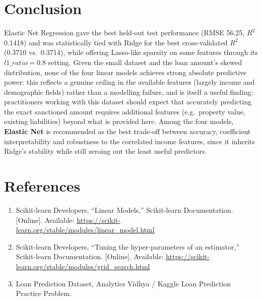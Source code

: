 \documentclass[12pt,a4paper]{article}
\begin{document}
\section{Conclusion}
Elastic Net Regression gave the best held-out test performance (RMSE 56.25, $R^2$
0.1418) and was statistically tied with Ridge for the best cross-validated $R^2$
(0.3710 vs.\ 0.3714), while offering Lasso-like sparsity on some features through its
$l1\_ratio=0.8$ setting. Given the small dataset and the loan amount's skewed
distribution, none of the four linear models achieves strong absolute predictive power:
this reflects a genuine ceiling in the available features (largely income and
demographic fields) rather than a modelling failure, and is itself a useful finding:
practitioners working with this dataset should expect that accurately predicting the
exact sanctioned amount requires additional features (e.g.\ property value, existing
liabilities) beyond what is provided here. Among the four models, \textbf{Elastic Net} is
recommended as the best trade-off between accuracy, coefficient interpretability and
robustness to the correlated income features, since it inherits Ridge's stability while
still zeroing out the least useful predictors.

\section{References}
\begin{enumerate}
\item Scikit-learn Developers, ``Linear Models,'' Scikit-learn Documentation. [Online].
Available: \url{https://scikit-learn.org/stable/modules/linear_model.html}
\item Scikit-learn Developers, ``Tuning the hyper-parameters of an estimator,''
Scikit-learn Documentation. [Online]. Available:
\url{https://scikit-learn.org/stable/modules/grid_search.html}
\item Loan Prediction Dataset, Analytics Vidhya / Kaggle Loan Prediction Practice
Problem.
\end{enumerate}
\end{document}
